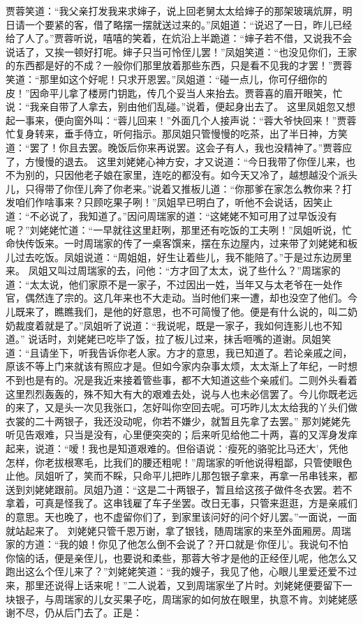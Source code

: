 \documentclass[12pt,oneside]{book}
\begin{document}
贾蓉笑道：“我父亲打发我来求婶子，说上回老舅太太给婶子的那架玻璃炕屏，明日请一个要紧的客，借了略摆一摆就送过来的。”凤姐道：“说迟了一日，昨儿已经给了人了。”贾蓉听说，嘻嘻的笑着，在炕沿上半跪道：“婶子若不借，又说我不会说话了，又挨一顿好打呢。婶子只当可怜侄儿罢！”凤姐笑道：“也没见你们，王家的东西都是好的不成？一般你们那里放着那些东西，只是看不见我的才罢！”贾蓉笑道：“那里如这个好呢！只求开恩罢。”凤姐道：“碰一点儿，你可仔细你的皮！”因命平儿拿了楼房门钥匙，传几个妥当人来抬去。贾蓉喜的眉开眼笑，忙说：“我亲自带了人拿去，别由他们乱碰。”说着，便起身出去了。
这里凤姐忽又想起一事来，便向窗外叫：“蓉儿回来！”外面几个人接声说：“蓉大爷快回来！”贾蓉忙复身转来，垂手侍立，听何指示。那凤姐只管慢慢的吃茶，出了半日神，方笑道：“罢了！你且去罢。晚饭后你来再说罢。这会子有人，我也没精神了。”贾蓉应了，方慢慢的退去。
这里刘姥姥心神方安，才又说道：“今日我带了你侄儿来，也不为别的，只因他老子娘在家里，连吃的都没有。如今天又冷了，越想越没个派头儿，只得带了你侄儿奔了你老来。”说着又推板儿道：“你那爹在家怎么教你来？打发咱们作啥事来？只顾吃果子咧！”凤姐早已明白了，听他不会说话，因笑止道：“不必说了，我知道了。”因问周瑞家的道：“这姥姥不知可用了过早饭没有呢？”刘姥姥忙道：“一早就往这里赶咧，那里还有吃饭的工夫咧！”凤姐听说，忙命快传饭来。一时周瑞家的传了一桌客馔来，摆在东边屋内，过来带了刘姥姥和板儿过去吃饭。凤姐说道：“周姐姐，好生让着些儿，我不能陪了。”于是过东边房里来。
凤姐又叫过周瑞家的去，问他：“方才回了太太，说了些什么？”周瑞家的道：“太太说，他们家原不是一家子，不过因出一姓，当年又与太老爷在一处作官，偶然连了宗的。这几年来也不大走动。当时他们来一遭，却也没空了他们。今儿既来了，瞧瞧我们，是他的好意思，也不可简慢了他。便是有什么说的，叫二奶奶裁度着就是了。”凤姐听了说道：“我说呢，既是一家子，我如何连影儿也不知道。”
说话时，刘姥姥已吃毕了饭，拉了板儿过来，抹舌咂嘴的道谢。凤姐笑道：“且请坐下，听我告诉你老人家。方才的意思，我已知道了。若论亲戚之间，原该不等上门来就该有照应才是。但如今家内杂事太烦，太太渐上了年纪，一时想不到也是有的。况是我近来接着管些事，都不大知道这些个亲戚们。二则外头看着这里烈烈轰轰的，殊不知大有大的艰难去处，说与人也未必信罢了。今儿你既老远的来了，又是头一次见我张口，怎好叫你空回去呢。可巧昨儿太太给我的丫头们做衣裳的二十两银子，我还没动呢，你若不嫌少，就暂且先拿了去罢。”
那刘姥姥先听见告艰难，只当是没有，心里便突突的；后来听见给他二十两，喜的又浑身发痒起来，说道：“嗳！我也是知道艰难的。但俗语说：‘瘦死的骆驼比马还大’，凭他怎样，你老拔根寒毛，比我们的腰还粗呢！”周瑞家的听他说得粗鄙，只管使眼色止他。凤姐听了，笑而不睬，只命平儿把昨儿那包银子拿来，再拿一吊串钱来，都送到刘姥姥跟前。凤姐乃道：“这是二十两银子，暂且给这孩子做件冬衣罢。若不拿着，可真是怪我了。这串钱雇了车子坐罢。改日无事，只管来逛逛，方是亲戚们的意思。天也晚了，也不虚留你们了，到家里该问好的问个好儿罢。”一面说，一面就站起来了。
刘姥姥只管千恩万谢，拿了银钱，随周瑞家的来至外面厢房。周瑞家的方道：“我的娘！你见了他怎么倒不会说了？开口就是‘你侄儿’。我说句不怕你恼的话，便是亲侄儿，也要说和柔些，那蓉大爷才是他的正经侄儿呢，他怎么又跑出这么个侄儿来了？”刘姥姥笑道：“我的嫂子，我见了他，心眼儿里爱还爱不过来，那里还说得上话来呢！”二人说着，又到周瑞家坐了片时。刘姥姥便要留下一块银子，与周瑞家的儿女买果子吃，周瑞家的如何放在眼里，执意不肯。刘姥姥感谢不尽，仍从后门去了。正是：
\end{document}
